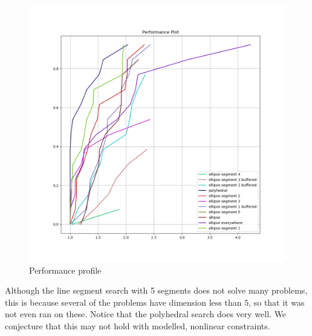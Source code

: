\begin{figure}[h]
    \centering
    \includegraphics[scale=0.4]{images/performance_profile_plot.png}
    \caption{Performance profile}
    \label{performance_profile}
\end{figure}



Although the line segment search with 5 segments does not solve many problems, this is because several of the problems have dimension less than $5$, so that it was not even ran on these.
Notice that the polyhedral search does very well.
We conjecture that this may not hold with modelled, nonlinear constraints.


